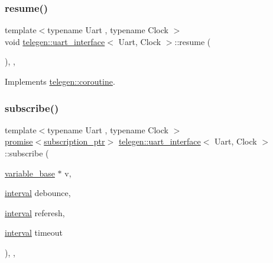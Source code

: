 \mbox{\label{classtelegen_1_1uart__interface_acc4f7dbff9e17b04a55ece5f447272df}} 
\subsubsection{\texorpdfstring{resume()}{resume()}}
{\footnotesize\ttfamily template$<$typename Uart , typename Clock $>$ \\
void \hyperlink{classtelegen_1_1uart__interface}{telegen\+::uart\+\_\+interface}$<$ Uart, Clock $>$\+::resume (\begin{DoxyParamCaption}{ }\end{DoxyParamCaption})\hspace{0.3cm}{\ttfamily [inline]}, {\ttfamily [override]}, {\ttfamily [virtual]}}



Implements \hyperlink{structtelegen_1_1coroutine_a2a7408a5b9474af3e59128934e3a5c00}{telegen\+::coroutine}.

\mbox{\label{classtelegen_1_1uart__interface_a869d06375865913880cf9818150c5b6e}} 
\subsubsection{\texorpdfstring{subscribe()}{subscribe()}}
{\footnotesize\ttfamily template$<$typename Uart , typename Clock $>$ \\
\hyperlink{namespacetelegen_a9dd802bb5d30cf96b0c616750d43ae86}{promise}$<$\hyperlink{namespacetelegen_a27c822534a5231fe1c523c81e8768afb}{subscription\+\_\+ptr}$>$ \hyperlink{classtelegen_1_1uart__interface}{telegen\+::uart\+\_\+interface}$<$ Uart, Clock $>$\+::subscribe (\begin{DoxyParamCaption}\item[{\hyperlink{classtelegen_1_1variable__base}{variable\+\_\+base} $\ast$}]{v,  }\item[{\hyperlink{namespacetelegen_ad925de2d0a99bc43918533abf0457344}{interval}}]{debounce,  }\item[{\hyperlink{namespacetelegen_ad925de2d0a99bc43918533abf0457344}{interval}}]{referesh,  }\item[{\hyperlink{namespacetelegen_ad925de2d0a99bc43918533abf0457344}{interval}}]{timeout }\end{DoxyParamCaption})\hspace{0.3cm}{\ttfamily [inline]}, {\ttfamily [override]}, {\ttfamily [virtual]}}



